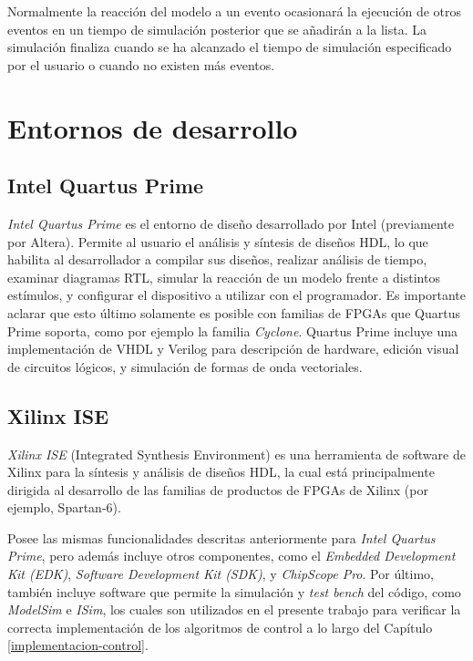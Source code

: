 Normalmente la reacción del modelo a un evento ocasionará la ejecución de otros eventos en un tiempo de simulación posterior que se añadirán a la lista. La simulación finaliza cuando se ha alcanzado el tiempo de simulación especificado por el usuario o cuando no existen más eventos.

\section{Entornos de desarrollo} 
\label{desarrollo-fpga}

\subsection{Intel Quartus Prime}

\emph{Intel Quartus Prime} es el entorno de diseño desarrollado por Intel (previamente por Altera). Permite al usuario el análisis y síntesis de diseños HDL, lo que habilita al desarrollador a compilar sus diseños, realizar análisis de tiempo, examinar diagramas RTL, simular la reacción de un modelo frente a distintos estímulos, y configurar el dispositivo a utilizar con el programador. Es importante aclarar que esto último solamente es posible con familias de FPGAs que Quartus Prime soporta, como por ejemplo la familia \emph{Cyclone}.
Quartus Prime incluye una implementación de VHDL y Verilog para descripción de hardware, edición visual de circuitos lógicos, y simulación de formas de onda vectoriales.

\subsection{Xilinx ISE}

\emph{Xilinx ISE} (Integrated Synthesis Environment) es una herramienta de software de Xilinx para la síntesis y análisis de diseños HDL, la cual está principalmente dirigida al desarrollo de las familias de productos de FPGAs de Xilinx (por ejemplo, Spartan-6).

Posee las mismas funcionalidades descritas anteriormente para \emph{Intel Quartus Prime}, pero además incluye otros componentes, como el \emph{Embedded Development Kit (EDK)}, \emph{Software Development Kit (SDK)}, y \emph{ChipScope Pro}. Por último, también incluye software que permite la simulación y \emph{test bench} del código, como \emph{ModelSim} e \emph{ISim}, los cuales son utilizados en el presente trabajo para verificar la correcta implementación de los algoritmos de control a lo largo del Capítulo \ref{implementacion-control}.

